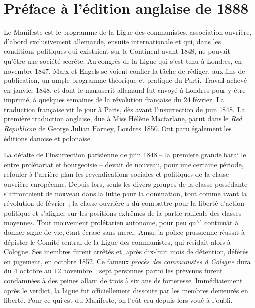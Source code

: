 \documentclass[french,twoside]{book} %
\begin{document}
\section[Préface à l’édition anglaise de 1888]{Préface à l’édition anglaise de 1888}
\noindent Le Manifeste est le programme de la Ligue des communistes, association ouvrière, d’abord exclusivement allemande, ensuite internationale et qui, dans les conditions politiques qui existaient sur le Continent avant 1848, ne pouvait qu’être une société secrète. Au congrès de la Ligue qui s’est tenu à Londres, en novembre 1847, Marx et Engels se voient confier la tâche de rédiger, aux fins de publication, un ample programme théorique et pratique du Parti. Travail achevé en janvier 1848, et dont le manuscrit allemand fut envoyé à Londres pour y être imprimé, à quelques semaines de la révolution française du 24 février. La traduction française vit le jour à Paris, dès avant l’insurrection de juin 1848. La première traduction anglaise, due à Miss Hélène Macfarlane, parut dans le \emph{Red Republican} de George Julian Harney, Londres 1850. Ont paru également les éditions danoise et polonaise.\par
La défaite de l’insurrection parisienne de juin 1848 – la première grande bataille entre prolétariat et bourgeoisie – devait de nouveau, pour une certaine période, refouler à l’arrière-plan les revendications sociales et politiques de la classe ouvrière européenne. Depuis lors, seuls les divers groupes de la classe possédante s’affrontaient de nouveau dans la lutte pour la domination, tout comme avant la révolution de février ; la classe ouvrière a dû combattre pour la liberté d’action politique et s’aligner sur les positions extrêmes de la partie radicale des classes moyennes. Tout mouvement prolétarien autonome, pour peu qu’il continuât à donner signe de vie, était écrasé sans merci. Ainsi, la police prussienne réussit à dépister le Comité central de la Ligue des communistes, qui résidait alors à Cologne. Ses membres furent arrêtés et, après dix-huit mois de détention, déférés en jugement, en octobre 1852. Ce fameux \emph{procès des communistes à Cologne} dura du 4 octobre au 12 novembre ; sept personnes parmi les prévenus furent condamnées à des peines allant de trois à six ans de forteresse. Immédiatement après le verdict, la Ligue fut officiellement dissoute par les membres demeurés en liberté. Pour ce qui est du Manifeste, on l’eût cru depuis lors voué à l’oubli.\par
\end{document}
